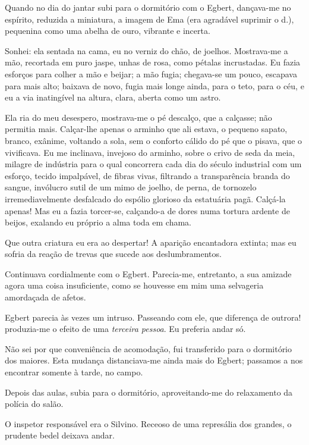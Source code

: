Quando no dia do jantar subi para o dormitório com o Egbert, dançava{}-me no
espírito, reduzida a miniatura, a imagem de Ema (era agradável suprimir
o d.), pequenina como uma abelha de ouro, vibrante e incerta. 

Sonhei: ela sentada na cama, eu no verniz do chão, de joelhos. Mostrava{}-me a
mão, recortada em puro jaspe, unhas de rosa, como pétalas incrustadas.
Eu fazia esforços para colher a mão e beijar; a mão fugia; chegava{}-se
um pouco, escapava para mais alto; baixava de novo, fugia mais longe
ainda, para o teto, para o céu, e eu a via inatingível na altura,
clara, aberta como um astro. 

Ela ria do meu desespero, mostrava{}-me o
pé descalço, que a calçasse; não permitia mais. Calçar{}-lhe apenas o
arminho que ali estava, o pequeno sapato, branco, exânime, voltando a
sola, sem o conforto cálido do pé que o pisava, que o vivificava. 
Eu me inclinava, invejoso
do arminho, sobre o crivo de seda da meia, milagre de indústria para o
qual concorrera cada dia do século industrial com um esforço, tecido
impalpável, de fibras vivas, filtrando a transparência branda do
sangue, invólucro sutil de um mimo de joelho, de perna, de tornozelo
irremediavelmente desfalcado do espólio glorioso da estatuária pagã.
Calçá{}-la apenas! Mas eu a fazia torcer{}-se, calçando{}-a de dores
numa tortura ardente de beijos, exalando eu próprio a alma toda em
chama. 

Que outra criatura eu era ao despertar! A aparição encantadora
extinta; mas eu sofria da reação de trevas que sucede aos
deslumbramentos. 

Continuava cordialmente com o Egbert. Parecia{}-me,
entretanto, a sua amizade agora uma coisa insuficiente, como se
houvesse em mim uma selvageria amordaçada de afetos. 

Egbert parecia às
vezes um intruso. Passeando com ele, que diferença de outrora!
produzia{}-me o efeito de uma \textit{terceira pessoa}. Eu preferia andar só.

Não sei por que conveniência de acomodação, fui transferido para o
dormitório dos maiores. Esta mudança distanciava{}-me ainda mais do
Egbert; passamos a nos encontrar somente à tarde, no campo. 

Depois das aulas, subia para o dormitório, aproveitando{}-me do relaxamento da
polícia do salão. 

O inspetor responsável era o Silvino. Receoso de uma
represália dos grandes, o prudente bedel deixava andar. 

